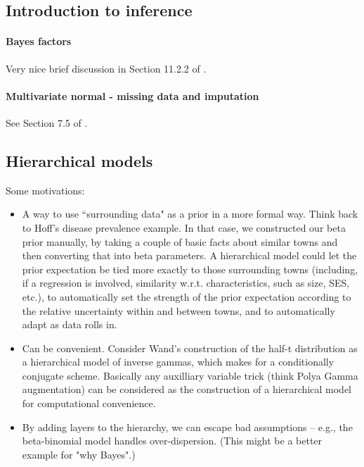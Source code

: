 \documentclass{article} %
\begin{document}
\subsection{Introduction to inference}

\paragraph{Bayes factors}

Very nice brief discussion in Section 11.2.2 of \cite{davison2003statistical}. 

\paragraph{Multivariate normal - missing data and imputation}

See Section 7.5 of \cite{hoff2009first}.

\subsection{Hierarchical models}

Some motivations:  
\begin{itemize}
\item A way to use ``surrounding data" as a prior in a more formal way.    Think back to Hoff's disease prevalence example.    In that case,  we constructed our beta prior manually,  by taking a couple of basic facts about similar towns and then converting that into beta parameters.    A hierarchical model could let the prior expectation be tied more exactly to those surrounding towns (including, if a regression is involved,  similarity w.r.t.  characteristics,  such as size,  SES,  etc.),  to automatically set the strength of the prior expectation according to the relative uncertainty within and between towns,  and to automatically adapt as data rolls in. 
\item Can be convenient.  Consider Wand's construction of the half-t distribution as a hierarchical model of inverse gammas,  which makes for a conditionally conjugate scheme.  Basically any auxilliary variable trick (think Polya Gamma augmentation) can be considered as the construction of a hierarchical model for computational convenience.  
\item By adding layers to the hierarchy,  we can escape bad assumptions -- e.g.,  the beta-binomial model handles over-dispersion.   (This might be a better example for "why Bayes".)
\end{itemize}
\end{document}
